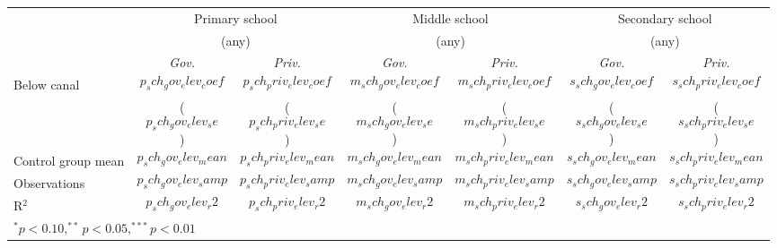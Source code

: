 {\setlength{\tabcolsep}{1.5em}
  \begin{tabular}{lcc|cc|cc}
    & \multicolumn{2}{c}{Primary school} & \multicolumn{2}{c}{Middle school} & \multicolumn{2}{c}{Secondary school}\\
    & \multicolumn{2}{c}{(any)} & \multicolumn{2}{c}{(any)} & \multicolumn{2}{c}{(any)}\\
    \hline
& \textit{Gov.} & \textit{Priv.} & \textit{Gov.} & \textit{Priv.} & \textit{Gov.} & \textit{Priv.} \\
    \hline\hline
    \hspace{0.5cm}Below canal& $$p_sch_gov_elev_coef$$ & $$p_sch_priv_elev_coef$$ & $$m_sch_gov_elev_coef$$ & $$m_sch_priv_elev_coef$$ & $$s_sch_gov_elev_coef$$ & $$s_sch_priv_elev_coef$$ \\
    &  ($$p_sch_gov_elev_se$$) & ($$p_sch_priv_elev_se$$) & ($$m_sch_gov_elev_se$$) & ($$m_sch_priv_elev_se$$)  & ($$s_sch_gov_elev_se$$) & ($$s_sch_priv_elev_se$$)\\
    \hspace{0.5cm}Control group mean&  $$p_sch_gov_elev_mean$$ & $$p_sch_priv_elev_mean$$ & $$m_sch_gov_elev_mean$$ & $$m_sch_priv_elev_mean$$ & $$s_sch_gov_elev_mean$$ & $$s_sch_priv_elev_mean$$\\
    \hspace{0.5cm}Observations& $$p_sch_gov_elev_samp$$ & $$p_sch_priv_elev_samp$$ & $$m_sch_gov_elev_samp$$ & $$m_sch_priv_elev_samp$$ & $$s_sch_gov_elev_samp$$ & $$s_sch_priv_elev_samp$$ \\
    \hspace{0.5cm}R$^{2}$& $$p_sch_gov_elev_r2$$ & $$p_sch_priv_elev_r2$$ & $$m_sch_gov_elev_r2$$ & $$m_sch_priv_elev_r2$$ & $$s_sch_gov_elev_r2$$ & $$s_sch_priv_elev_r2$$\\
    \hline     
    \multicolumn{7}{l}{$^{*}p<0.10, ^{**}p<0.05, ^{***}p<0.01$} \\
\end{tabular}}
